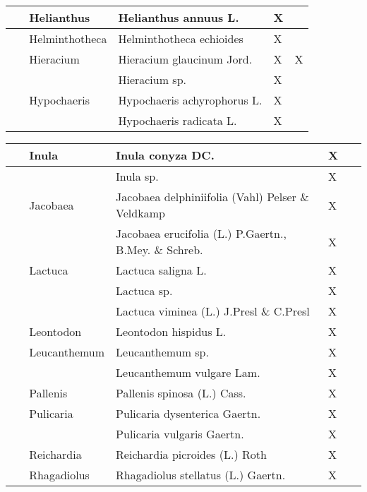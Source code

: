 \documentclass[main.tex]{subfiles}
\begin{document}
\begin{table}[!ht]
\begin{tabular}[\footnotesize]{|p{2.4cm}|p{1.9cm}|p{5.8cm}|p{1.1cm}|p{1cm}|}
        ~ & Helianthus & Helianthus annuus L. & X & ~ \\ \hline
        ~ & Helminthotheca & Helminthotheca echioides & X & ~ \\ \hline
        ~ & Hieracium & Hieracium glaucinum Jord. & X & X \\ \hline
        ~ & ~ & Hieracium sp. & X & ~ \\ \hline
        ~ & Hypochaeris & Hypochaeris achyrophorus L. & X & ~ \\ \hline
        ~ & ~ & Hypochaeris radicata L. & X & ~ \\ \hline
       \end{tabular}
    \end{table}
    
    \clearpage
        
        \begin{table}[!ht]
        \centering
    \begin{tabular}[\footnotesize]{|p{2.4cm}|p{1.9cm}|p{5.8cm}|p{1.1cm}|p{1cm}|}
    \hline
        ~ & Inula & Inula conyza DC. & X & ~ \\ \hline
        ~ & ~ & Inula sp. & X & ~ \\ \hline
        ~ & Jacobaea & Jacobaea delphiniifolia (Vahl) Pelser \& Veldkamp & X & ~ \\ \hline
        ~ & ~ & Jacobaea erucifolia (L.) P.Gaertn., B.Mey. \& Schreb. & X & ~ \\ \hline
        ~ & Lactuca & Lactuca saligna L. & X & ~ \\ \hline
        ~ & ~ & Lactuca sp. & X & ~ \\ \hline
        ~ & ~ & Lactuca viminea (L.) J.Presl \& C.Presl & X & ~ \\ \hline
        ~ & Leontodon & Leontodon hispidus L. & X & ~ \\ \hline
        ~ & Leucanthemum & Leucanthemum sp. & X & ~ \\ \hline
        ~ & ~ & Leucanthemum vulgare Lam. & X & ~ \\ \hline
        ~ & Pallenis & Pallenis spinosa (L.) Cass. & X & ~ \\ \hline
        ~ & Pulicaria & Pulicaria dysenterica Gaertn. & X & ~ \\ \hline
        ~ & ~ & Pulicaria vulgaris Gaertn. & X & ~ \\ \hline
        ~ & Reichardia & Reichardia picroides (L.) Roth & X & ~ \\ \hline
        ~ & Rhagadiolus & Rhagadiolus stellatus (L.) Gaertn. & X & ~ \\ \hline

\end{tabular}
\end{table}
\end{document}
